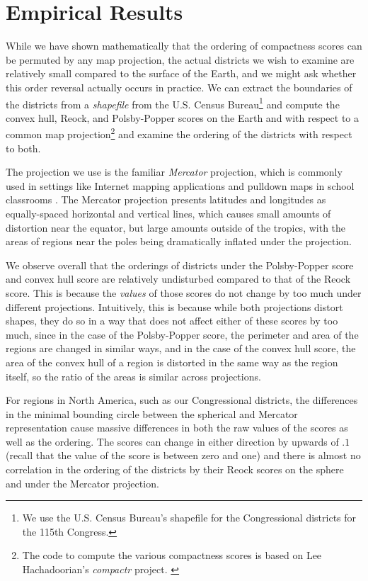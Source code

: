 
\section{Empirical Results}\label{sec:exper}




While we have shown mathematically that the ordering of compactness scores can be permuted by any map 
projection, the actual districts we wish to examine are relatively small compared to the surface of the Earth, 
and we might ask whether this order reversal actually occurs in practice.
We can extract the boundaries of the districts from a \textit{shapefile} from the U.S. Census Bureau\footnote{We use the U.S. Census Bureau's shapefile for the Congressional districts for the 115th Congress.} and compute the convex hull, Reock, and Polsby-Popper scores on the Earth and with respect to a common map projection\footnote{The code to compute the various compactness scores is based on Lee Hachadoorian's \textit{compactr} project. \cite{hachadoorian2018reock}} and examine the ordering of the districts with respect to both.

The projection we use is the familiar \textit{Mercator} projection, which is commonly used in settings like Internet mapping applications and pulldown maps in school classrooms \cite{westwing}.  
The Mercator projection presents latitudes and longitudes as equally-spaced horizontal and vertical lines, which causes small amounts of distortion near the equator, but large amounts outside of the tropics, with the areas of regions near the poles being dramatically inflated under the projection.








We observe overall that the orderings of districts under the Polsby-Popper score and convex hull score are relatively undisturbed compared to that of the Reock score.  This is because the \textit{values} of those scores do not change by too much under different projections.  Intuitively, this is because while both projections distort shapes, they do so in a way that does not affect either of these scores by too much, since in the case of the Polsby-Popper score, the perimeter and area of the regions are changed in similar ways, and in the case of the convex hull score, the area of the convex hull of a region is distorted in the same way as the region itself, so the ratio of the areas is similar across projections.

For regions in North America, such as our Congressional districts, the differences in the minimal bounding circle between the spherical and Mercator representation cause massive differences in both the raw values of the scores as well as the ordering.  The scores can change in either direction by upwards of $.1$ (recall that the value of the score is between zero and one) and there is almost no correlation in the ordering of the districts by their Reock scores on the sphere and under the Mercator projection. 

